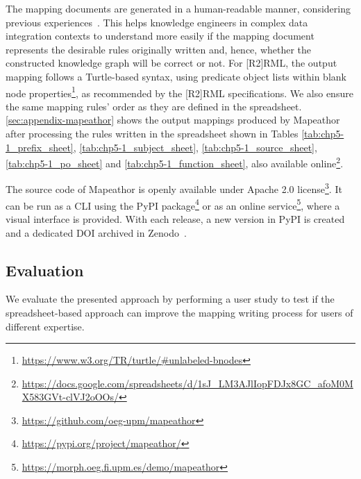 The mapping documents are generated in a human-readable manner, considering previous experiences~\parencite{chaves2022systematic,corcho2021high,chaves2020bench}.
This helps knowledge engineers in complex data integration contexts to understand more easily if the mapping document represents the desirable rules originally written and, hence, whether the constructed knowledge graph will be correct or not. 
For [R2]RML, the output mapping follows a Turtle-based syntax, using predicate object lists within blank node properties\footnote{\url{https://www.w3.org/TR/turtle/\#unlabeled-bnodes}}, as recommended by the [R2]RML specifications.
We also ensure the same mapping rules' order as they are defined in the spreadsheet.
\cref{sec:appendix-mapeathor} shows the output mappings produced by Mapeathor after processing the rules written in the spreadsheet shown in Tables \ref{tab:chp5-1_prefix_sheet}, \ref{tab:chp5-1_subject_sheet}, \ref{tab:chp5-1_source_sheet}, \ref{tab:chp5-1_po_sheet} and \ref{tab:chp5-1_function_sheet}, also available online\footnote{\url{https://docs.google.com/spreadsheets/d/1sJ_LM3AJlIopFDJx8GC_afoM0MX583GVt-clVJ2oOOs/}}.




The source code of Mapeathor is openly available under Apache 2.0 license\footnote{\url{https://github.com/oeg-upm/mapeathor}}. It can be run as a CLI using the PyPI package\footnote{\url{https://pypi.org/project/mapeathor/}} or as an online service\footnote{\url{https://morph.oeg.fi.upm.es/demo/mapeathor}}, where a visual interface is provided. With each release, a new version in PyPI is created and a dedicated DOI archived in Zenodo~\parencite{iglesias-molina_2023_5973906}. 




\subsection{Evaluation}
We evaluate the presented approach by performing a user study to test %
if the spreadsheet-based approach can improve the mapping writing process for users of different expertise. 

